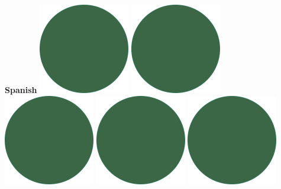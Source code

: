 \documentclass[]{commands}
\begin{document}
\begin{aside}
\textbf{Spanish}\hfill
\includegraphics[scale=0.11]{img/IPSGreenDots.png}
\includegraphics[scale=0.11]{img/IPSGreenDots.png}
\includegraphics[scale=0.11]{img/IPSGreenDots.png}
\includegraphics[scale=0.11]{img/IPSGreenDots.png}
\includegraphics[scale=0.11]{img/IPSGreenDots.png}


\end{aside}
\end{document}
